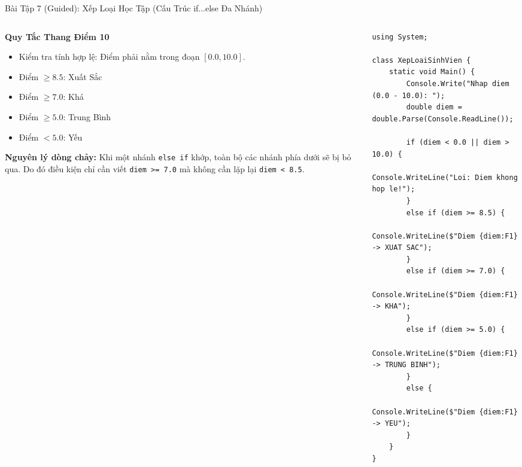 \documentclass[aspectratio=169, 10pt]{beamer}
\begin{document}
\begin{frame}[fragile]{Bài Tập 7 (Guided): Xếp Loại Học Tập (Cấu Trúc if...else Đa Nhánh)}
  \begin{columns}[T]
    \begin{column}{0.45\textwidth}
      \begin{block}{\textbf{Quy Tắc Thang Điểm 10}}
        \begin{itemize}
          \item Kiểm tra tính hợp lệ: Điểm phải nằm trong đoạn $[0.0, 10.0]$.
          \item Điểm $\ge 8.5$: Xuất Sắc
          \item Điểm $\ge 7.0$: Khá
          \item Điểm $\ge 5.0$: Trung Bình
          \item Điểm $< 5.0$: Yếu
        \end{itemize}
      \end{block}
      \begin{tcolorbox}[colback=UniLightBlue!30,colframe=UniBlue]
        \textbf{Nguyên lý dòng chảy:} Khi một nhánh \texttt{else if} khớp, toàn bộ các nhánh phía dưới sẽ bị bỏ qua. Do đó điều kiện chỉ cần viết \texttt{diem >= 7.0} mà không cần lặp lại \texttt{diem < 8.5}.
      \end{tcolorbox}
    \end{column}
    \begin{column}{0.53\textwidth}
\begin{lstlisting}[basicstyle=\ttfamily\tiny]
using System;

class XepLoaiSinhVien {
    static void Main() {
        Console.Write("Nhap diem (0.0 - 10.0): ");
        double diem = double.Parse(Console.ReadLine());

        if (diem < 0.0 || diem > 10.0) {
            Console.WriteLine("Loi: Diem khong hop le!");
        }
        else if (diem >= 8.5) {
            Console.WriteLine($"Diem {diem:F1} -> XUAT SAC");
        }
        else if (diem >= 7.0) {
            Console.WriteLine($"Diem {diem:F1} -> KHA");
        }
        else if (diem >= 5.0) {
            Console.WriteLine($"Diem {diem:F1} -> TRUNG BINH");
        }
        else {
            Console.WriteLine($"Diem {diem:F1} -> YEU");
        }
    }
}
\end{lstlisting}
    \end{column}
  \end{columns}
\end{frame}
\end{document}
